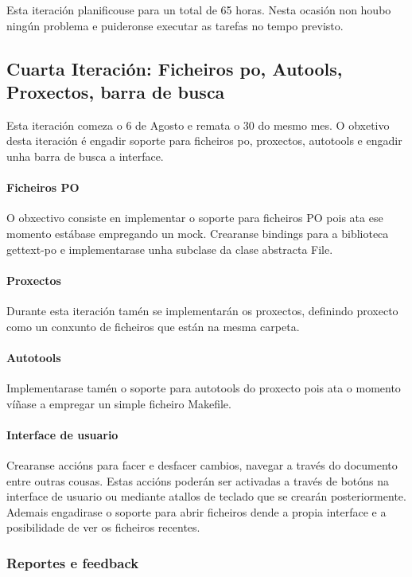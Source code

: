 Esta iteración planificouse para un total de 65 horas. Nesta ocasión non houbo ningún problema e puideronse executar as tarefas no tempo previsto.

\subsection{Cuarta Iteración: Ficheiros po, Autools, Proxectos, barra de busca}
Esta iteración comeza o 6 de Agosto e remata o 30 do mesmo mes. O obxetivo desta iteración é engadir soporte para ficheiros po, proxectos, autotools e engadir unha barra de busca a interface.

\paragraph{Ficheiros PO}
O obxectivo consiste en implementar o soporte para ficheiros PO pois ata ese momento estábase empregando un mock. Crearanse bindings para a biblioteca gettext-po e implementarase unha subclase da clase abstracta File.

\paragraph{Proxectos}
Durante esta iteración tamén se implementarán os proxectos, definindo proxecto como un conxunto de ficheiros que están na mesma carpeta.

\paragraph{Autotools}
Implementarase tamén o soporte para autotools do proxecto pois ata o momento víñase a empregar un simple ficheiro Makefile.

\paragraph{Interface de usuario}
Crearanse accións para facer e desfacer cambios, navegar a través do documento entre outras cousas. Estas accións poderán ser activadas a través de botóns na interface de usuario ou mediante atallos de teclado que se crearán posteriormente. Ademais engadirase o soporte para abrir ficheiros dende a propia interface e a posibilidade de ver os ficheiros recentes.

\subsubsection{Reportes e feedback}


